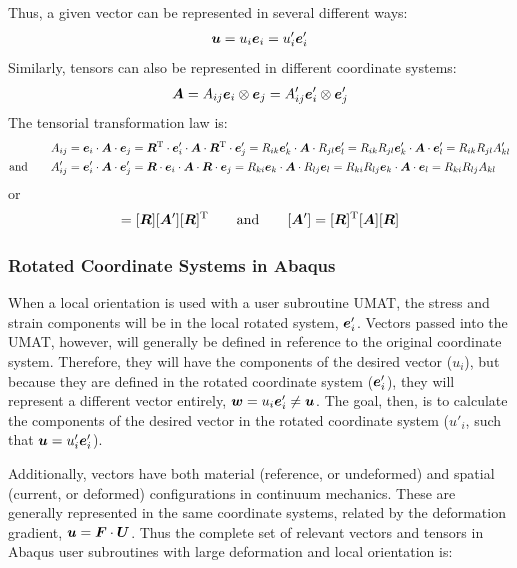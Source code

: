 \documentclass[10pt,letterpaper,oneside]{report}
\newcommand{\ten}[1]{\mbox{\boldmath $#1$}{}}
\newcommand{\scas}[1]{\mbox{{\scriptsize{${\rm{#1}}$}}}{}}
\begin{document}
Thus, a given vector can be represented in several different ways:
\begin{align}
\ten{u} = u_i \ten{e}_i = u'_i \ten{e}'_i
\end{align}
Similarly, tensors can also be represented in different coordinate systems:
\begin{align}
\ten{A} = A_{ij} \ten{e}_i \otimes \ten{e}_j = A'_{ij} \ten{e}'_i \otimes \ten{e}'_j 
\end{align}
The tensorial transformation law is:
\begin{align}
A_{ij} &
= \ten{e}_i \cdot \ten{A} \cdot \ten{e}_j 
= \ten{R}^{\scas{T}} \cdot \ten{e}'_i \cdot \ten{A} \cdot \ten{R}^{\scas{T}} \cdot \ten{e}'_j 
= R_{ik} \ten{e}'_k \cdot \ten{A} \cdot R_{jl} \ten{e}'_l 
= R_{ik} R_{jl} \ten{e}'_k \cdot \ten{A} \cdot \ten{e}'_l 
= R_{ik} R_{jl} A'_{kl} 
\\ \mbox{and} \qquad
A'_{ij} &
= \ten{e}'_i \cdot \ten{A} \cdot \ten{e}'_j 
= \ten{R} \cdot \ten{e}_i \cdot \ten{A} \cdot \ten{R} \cdot \ten{e}_j 
= R_{ki} \ten{e}_k \cdot \ten{A} \cdot R_{lj} \ten{e}_l 
= R_{ki} R_{lj} \ten{e}_k \cdot \ten{A} \cdot \ten{e}_l 
= R_{ki} R_{lj} A_{kl}
\end{align}
or 
\begin{align}
[ \ten{A} ] = [ \ten{R} ] [ \ten{A}' ] [ \ten{R} ]^{\scas{T}}
\qquad \text{and} \qquad
[ \ten{A}' ] = [ \ten{R} ]^{\scas{T}} [ \ten{A} ] [ \ten{R} ] 
\end{align}


\subsubsection{Rotated Coordinate Systems in Abaqus}
When a local orientation is used with a user subroutine UMAT, the stress and strain components will be in the local rotated system, $\ten{e}'_i$.  Vectors passed into the UMAT, however, will generally  be defined in reference to the original coordinate system.  Therefore, they will have the components of the desired vector ($u_i$), but because they are defined in the rotated coordinate system ($\ten{e}'_i$), they will represent a different vector entirely, $\ten{w} = u_i \ten{e}'_i \neq \ten{u}$.  The goal, then, is to calculate the components of the desired vector in the rotated coordinate system ($u'_i$, such that $\ten{u} = u'_i \ten{e}'_i$).

Additionally, vectors have both material (reference, or undeformed) and spatial (current, or deformed) configurations in continuum mechanics.  These are generally represented in the same coordinate systems, related by the deformation gradient, $\ten{u} = \ten{F} \cdot \ten{U}$.  Thus the complete set of relevant vectors and tensors in Abaqus user subroutines with large deformation and local orientation is:
\end{document}

